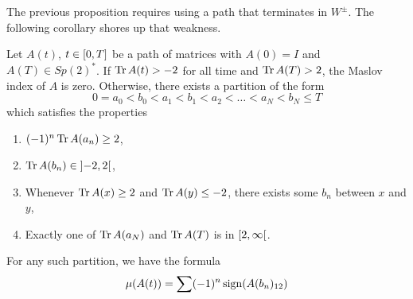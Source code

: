 The previous proposition requires using a path that terminates in $W^\pm$. The following corollary shores up that weakness.

\begin{corollary}\label{calcmaslov1}
Let $A(t)$, $t \in \interval 0 T$ be a path of matrices with $A(0) = I$ and $A(T) \in Sp(2)^*$. If $\operatorname{Tr} A(t) > -2$ for all time and $\operatorname{Tr} A(T) > 2$, the Maslov index of $A$ is zero. Otherwise, there exists a partition of the form
\begin{equation}
0 = a_0 < b_0 < a_1 < b_1 < a_2 < \dots < a_N < b_N \leq T
\end{equation}
which satisfies the properties
\begin{enumerate}
\item $(-1)^n \operatorname{Tr} A(a_n) \geq 2$,
\item $\trace A(b_n) \in \ointerval{-2}2$,
\item Whenever $\operatorname{Tr} A(x) \geq 2$ and $\operatorname{Tr} A(y) \leq -2$, there exists some $b_n$ between $x$ and $y$,
\item\label{calcmaslov:ab5} Exactly one of $\operatorname{Tr} A(a_N)$ and $\operatorname{Tr} A(T)$ is in $\rinterval 2 \infty$.
\end{enumerate}

For any such partition, we have the formula
\begin{equation}\label{calcmaslov:mu}
\mu(A(t)) = \sum (-1)^n \operatorname{sign}(A(b_n)_{12})
\end{equation}
\end{corollary}

